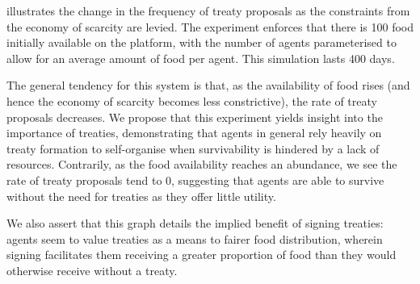  illustrates the change in the frequency of treaty proposals as the constraints from the economy of scarcity are levied. The experiment enforces that there is 100 food initially available on the platform, with the number of agents parameterised to allow for an average amount of food per agent. This simulation lasts 400 days.

The general tendency for this system is that, as the availability of food rises (and hence the economy of scarcity becomes less constrictive), the rate of treaty proposals decreases. We propose that this experiment yields insight into the importance of treaties, demonstrating that agents in general rely heavily on treaty formation to self-organise when survivability is hindered by a lack of resources. Contrarily, as the food availability reaches an abundance, we see the rate of treaty proposals tend to 0, suggesting that agents are able to survive without the need for treaties as they offer little utility.

We also assert that this graph details the implied benefit of signing treaties: agents seem to value treaties as a means to fairer food distribution, wherein signing facilitates them receiving a greater proportion of food than they would otherwise receive without a treaty.

